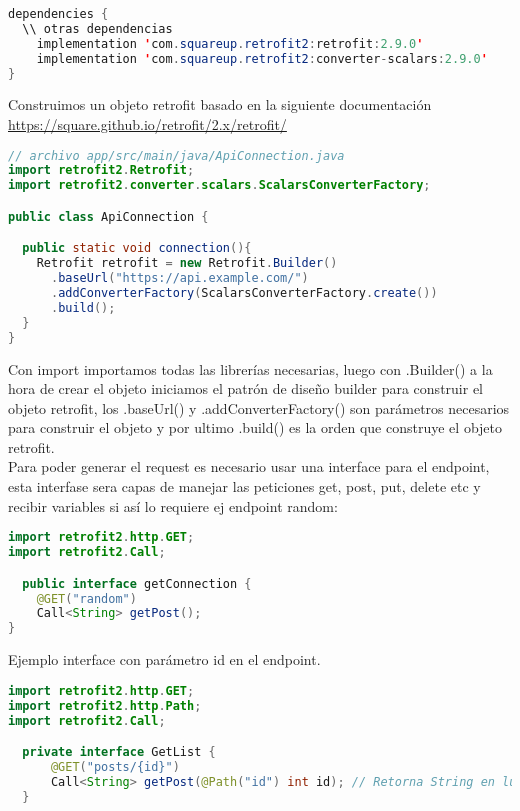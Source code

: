 \begin{lstlisting}[language=java]
dependencies {
  \\ otras dependencias
    implementation 'com.squareup.retrofit2:retrofit:2.9.0'
    implementation 'com.squareup.retrofit2:converter-scalars:2.9.0'
}
\end{lstlisting}
Construimos un objeto retrofit basado en la siguiente documentación \url{https://square.github.io/retrofit/2.x/retrofit/}
\begin{lstlisting}[language=java]
// archivo app/src/main/java/ApiConnection.java
import retrofit2.Retrofit;
import retrofit2.converter.scalars.ScalarsConverterFactory;

public class ApiConnection {

  public static void connection(){
    Retrofit retrofit = new Retrofit.Builder()
      .baseUrl("https://api.example.com/")
      .addConverterFactory(ScalarsConverterFactory.create())
      .build();
  }
}
\end{lstlisting}
Con import importamos todas las librerías necesarias, luego con .Builder() a la hora de crear el objeto iniciamos el patrón de diseño builder para construir el objeto retrofit, los .baseUrl() y .addConverterFactory() son parámetros necesarios para construir el objeto y por ultimo .build() es la orden que construye el objeto retrofit.
\\
Para poder generar el request es necesario usar una interface para el endpoint, esta interfase sera capas de manejar las peticiones get, post, put, delete etc y recibir variables si así lo requiere ej endpoint random:
\begin{lstlisting}[language=java]
import retrofit2.http.GET;
import retrofit2.Call;

  public interface getConnection {
    @GET("random")
    Call<String> getPost();
}
\end{lstlisting}
Ejemplo interface con parámetro id en el endpoint.
\begin{lstlisting}[language=java]
import retrofit2.http.GET;
import retrofit2.http.Path;
import retrofit2.Call;

  private interface GetList {
      @GET("posts/{id}")
      Call<String> getPost(@Path("id") int id); // Retorna String en lugar de objeto
  }
\end{lstlisting}
